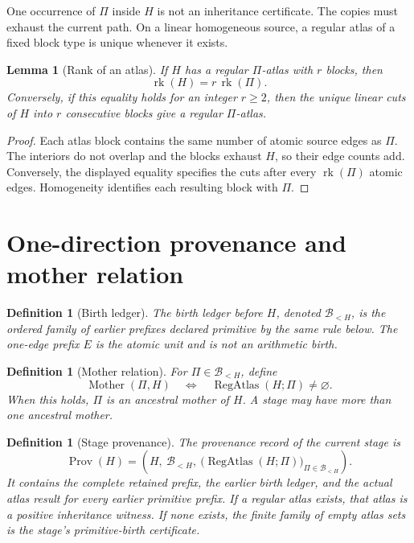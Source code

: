 \documentclass[11pt]{article}
\newtheorem{lemma}[theorem]{Lemma}
\newtheorem{definition}[theorem]{Definition}
\newcommand{\rk}{\operatorname{rk}}
\newcommand{\RegAtlas}{\operatorname{RegAtlas}}
\newcommand{\Prov}{\operatorname{Prov}}
\newcommand{\Mother}{\operatorname{Mother}}
\begin{document}
One occurrence of $\Pi$ inside $H$ is not an inheritance certificate.  The
copies must exhaust the current path.  On a linear homogeneous source, a
regular atlas of a fixed block type is unique whenever it exists.

\begin{lemma}[Rank of an atlas]
\label{lem:atlas-rank}
If $H$ has a regular $\Pi$-atlas with $r$ blocks, then
\[
\rk(H)=r\,\rk(\Pi).
\]
Conversely, if this equality holds for an integer $r\ge2$, then the unique
linear cuts of $H$ into $r$ consecutive blocks give a regular $\Pi$-atlas.
\end{lemma}

\begin{proof}
Each atlas block contains the same number of atomic source edges as $\Pi$.
The interiors do not overlap and the blocks exhaust $H$, so their edge counts
add.  Conversely, the displayed equality specifies the cuts after every
$\rk(\Pi)$ atomic edges.  Homogeneity identifies each resulting block with
$\Pi$.
\end{proof}

\section{One-direction provenance and mother relation}

\begin{definition}[Birth ledger]
The \emph{birth ledger before $H$}, denoted $\mathcal B_{<H}$, is the ordered
family of earlier prefixes declared primitive by the same rule below.  The
one-edge prefix \(E\) is the atomic unit and is not an arithmetic birth.
\end{definition}

\begin{definition}[Mother relation]
For $\Pi\in\mathcal B_{<H}$, define
\[
\Mother(\Pi,H)
\quad\Longleftrightarrow\quad
\RegAtlas(H;\Pi)\ne\varnothing.
\]
When this holds, $\Pi$ is an \emph{ancestral mother} of $H$.  A stage may have
more than one ancestral mother.
\end{definition}

\begin{definition}[Stage provenance]
The provenance record of the current stage is
\[
\Prov(H)
=
\left(
H,\ \mathcal B_{<H},\
\bigl(\RegAtlas(H;\Pi)\bigr)_{\Pi\in\mathcal B_{<H}}
\right).
\]
It contains the complete retained prefix, the earlier birth ledger, and the
actual atlas result for every earlier primitive prefix.  If a regular atlas
exists, that atlas is a positive inheritance witness.  If none exists, the
finite family of empty atlas sets is the stage's primitive-birth certificate.
\end{definition}
\end{document}
